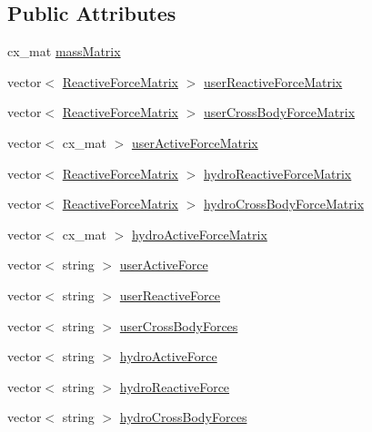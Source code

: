 \subsection*{Public Attributes}
\begin{DoxyCompactItemize}
\item 
cx\-\_\-mat \hyperlink{class_body_with_force_matrix_a3b07fb8ac7d58c1ed2b642676e51de6f}{mass\-Matrix}
\item 
vector$<$ \hyperlink{class_reactive_force_matrix}{Reactive\-Force\-Matrix} $>$ \hyperlink{class_body_with_force_matrix_a301fe6541bda12f4786c254688b1b89f}{user\-Reactive\-Force\-Matrix}
\item 
vector$<$ \hyperlink{class_reactive_force_matrix}{Reactive\-Force\-Matrix} $>$ \hyperlink{class_body_with_force_matrix_ad04bf64c3495a2d316f4ede7e6e307d3}{user\-Cross\-Body\-Force\-Matrix}
\item 
vector$<$ cx\-\_\-mat $>$ \hyperlink{class_body_with_force_matrix_aeb11660f006b6e86e8fc691bf55ce346}{user\-Active\-Force\-Matrix}
\item 
vector$<$ \hyperlink{class_reactive_force_matrix}{Reactive\-Force\-Matrix} $>$ \hyperlink{class_body_with_force_matrix_ab9be7a7eb8a4772ca011586590cfcbed}{hydro\-Reactive\-Force\-Matrix}
\item 
vector$<$ \hyperlink{class_reactive_force_matrix}{Reactive\-Force\-Matrix} $>$ \hyperlink{class_body_with_force_matrix_a0fe089e2b9d9bacaf38d8e2e957ee125}{hydro\-Cross\-Body\-Force\-Matrix}
\item 
vector$<$ cx\-\_\-mat $>$ \hyperlink{class_body_with_force_matrix_a8902e9ad82255e0794dff72725928ff9}{hydro\-Active\-Force\-Matrix}
\item 
vector$<$ string $>$ \hyperlink{class_body_with_force_matrix_adff7e3220bdcf4e367a5626afad29572}{user\-Active\-Force}
\item 
vector$<$ string $>$ \hyperlink{class_body_with_force_matrix_ad334068959cd4ad8591c31ff9d16225f}{user\-Reactive\-Force}
\item 
vector$<$ string $>$ \hyperlink{class_body_with_force_matrix_ad97183b090f4f9a1010bcfe028ec55b6}{user\-Cross\-Body\-Forces}
\item 
vector$<$ string $>$ \hyperlink{class_body_with_force_matrix_abab87c2d9bad9c11e526aa35fbe242cb}{hydro\-Active\-Force}
\item 
vector$<$ string $>$ \hyperlink{class_body_with_force_matrix_ade2cce8108c19527e229f960b7bf7cd1}{hydro\-Reactive\-Force}
\item 
vector$<$ string $>$ \hyperlink{class_body_with_force_matrix_ae43f824670c354999843f2cc3e0987c8}{hydro\-Cross\-Body\-Forces}
\end{DoxyCompactItemize}


